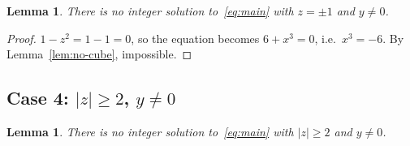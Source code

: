\documentclass[12pt,a4paper]{article}
\newtheorem{lemma}[theorem]{Lemma}
\theoremstyle{definition}
\begin{document}
\begin{lemma}\label{lem:case3}
  There is no integer solution to~\eqref{eq:main} with $z = \pm 1$ and
  $y \neq 0$.
\end{lemma}

\begin{proof}
  $1 - z^2 = 1 - 1 = 0$, so the equation becomes $6 + x^3 = 0$,
  i.e.\ $x^3 = -6$.  By Lemma~\ref{lem:no-cube}, impossible.
\end{proof}

\subsection{Case 4: \texorpdfstring{$|z| \geq 2$, $y \neq 0$}{|z| ≥ 2, y ≠ 0}}

\begin{lemma}\label{lem:case4}
  There is no integer solution to~\eqref{eq:main} with $|z| \geq 2$ and
  $y \neq 0$.
\end{lemma}
\end{document}
